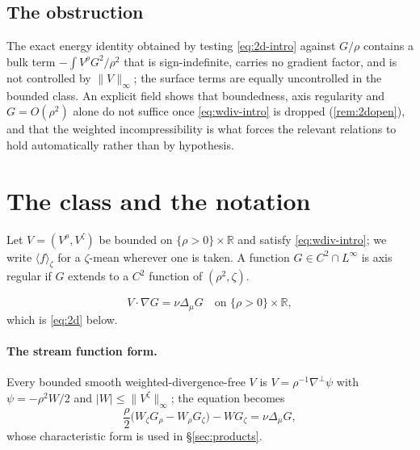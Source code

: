 \documentclass[11pt]{article}
\theoremstyle{definition}
\newcommand{\R}{\mathbb{R}}
\begin{document}
\subsection{The obstruction}
The exact energy identity obtained by testing \eqref{eq:2d-intro} against
$G/\rho$ contains a bulk term $-\int V^\rho G^2/\rho^2$ that is
sign-indefinite, carries no gradient factor, and is not controlled by
$\|V\|_\infty$; the surface terms are equally uncontrolled in the bounded
class. An explicit field shows that boundedness, axis regularity and
$G=O(\rho^2)$ alone do not suffice once \eqref{eq:wdiv-intro} is dropped
(\cref{rem:2dopen}), and that the weighted incompressibility is what forces
the relevant relations to hold automatically rather than by hypothesis.

\section{The class and the notation}
Let $V=(V^\rho,V^\zeta)$ be bounded on $\{\rho>0\}\times\R$ and satisfy
\eqref{eq:wdiv-intro}; we write $\langle f\rangle_\zeta$ for a $\zeta$-mean
wherever one is taken. A function $G\in C^2\cap L^\infty$ is axis regular if
$G$ extends to a $C^2$ function of $(\rho^2,\zeta)$.

\begin{equation}
V\cdot\nabla G=\nu\Delta_\mu G\quad\text{on }\{\rho>0\}\times\R ,
\end{equation}
which is \eqref{eq:2d} below.

\paragraph{The stream function form.}
Every bounded smooth weighted-divergence-free $V$ is $V=\rho^{-1}\nabla^\perp\psi$
with $\psi=-\rho^2W/2$ and $|W|\le\|V^\zeta\|_\infty$; the equation becomes
\begin{equation}\label{eq:2dW-intro}
\frac{\rho}{2}\bigl(W_\zeta G_\rho-W_\rho G_\zeta\bigr)-WG_\zeta
=\nu\Delta_\mu G ,
\end{equation}
whose characteristic form is used in \S\ref{sec:products}.
\end{document}
